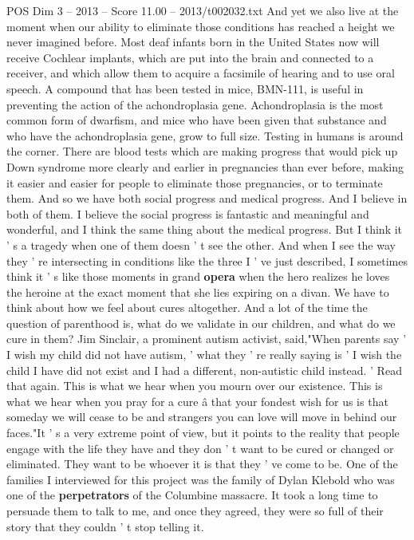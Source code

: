\begin{textsample}{POS Dim 3 – 2013 – Score 11.00 – 2013/t002032.txt}
And yet we also live at the moment when our ability to eliminate those conditions has reached a height we never imagined before.
Most deaf infants born in the United States now will receive Cochlear implants, which are put into the brain and connected to a receiver, and which allow them to acquire a facsimile of hearing and to use oral speech.
A compound that has been tested in mice, BMN-111, is useful in preventing the action of the achondroplasia gene.
Achondroplasia is the most common form of dwarfism, and mice who have been given that substance and who have the achondroplasia gene, grow to full size.
Testing in humans is around the corner.
There are blood tests which are making progress that would pick up Down syndrome more clearly and earlier in pregnancies than ever before, making it easier and easier for people to eliminate those pregnancies, or to terminate them.
And so we have both social progress and medical progress.
And I believe in both of them.
I believe the social progress is fantastic and meaningful and wonderful, and I think the same thing about the medical progress.
But I think it ' s a tragedy when one of them doesn ' t see the other.
And when I see the way they ' re intersecting in conditions like the three I ' ve just described, I sometimes think it ' s like those moments in grand \textbf{opera} when the hero realizes he loves the heroine at the exact moment that she lies expiring on a divan.
We have to think about how we feel about cures altogether.
And a lot of the time the question of parenthood is, what do we validate in our children, and what do we cure in them?
Jim Sinclair, a prominent autism activist, said,"When parents say ' I wish my child did not have autism, ' what they ' re really saying is ' I wish the child I have did not exist and I had a different, non-autistic child instead. ' Read that again.
This is what we hear when you mourn over our existence.
This is what we hear when you pray for a cure â that your fondest wish for us is that someday we will cease to be and strangers you can love will move in behind our faces."It ' s a very extreme point of view, but it points to the reality that people engage with the life they have and they don ' t want to be cured or changed or eliminated.
They want to be whoever it is that they ' ve come to be.
One of the families I interviewed for this project was the family of Dylan Klebold who was one of the \textbf{perpetrators} of the Columbine massacre.
It took a long time to persuade them to talk to me, and once they agreed, they were so full of their story that they couldn ' t stop telling it.

\end{textsample}
